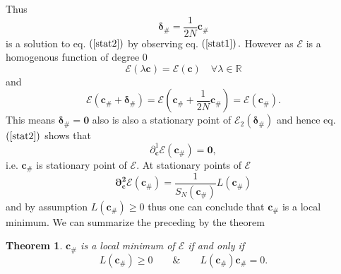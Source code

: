 \documentclass[aps,preprint]{revtex4}%
\newtheorem{theorem}{Theorem}
\begin{document}
Thus
\begin{equation}
\mathbf{\delta}_{\#}=\frac{1}{2N}\mathbf{c}_{\#}%
\end{equation}
is a solution to eq. $\left(  \ref{stat2}\right)  $ by observing eq. $\left(
\ref{stat1}\right)  .$ However as $\mathcal{E}$ is a homogenous function of
degree $0$
\begin{equation}
\mathcal{E}\left(  \lambda\mathbf{c}\right)  =\mathcal{E}\left(
\mathbf{c}\right)  \quad\forall\lambda\in\mathbb{R}%
\end{equation}
and
\begin{equation}
\mathcal{E}\left(  \mathbf{c}_{\#}+\mathbf{\delta}_{\#}\right)  =\mathcal{E}%
\left(  \mathbf{c}_{\#}+\frac{1}{2N}\mathbf{c}_{\#}\right)  =\mathcal{E}%
\left(  \mathbf{c}_{\#}\right)  .
\end{equation}
This means $\mathbf{\delta}_{\#}=\mathbf{0}$ also is also a stationary point
of $\mathcal{E}_{2}\left(  \mathbf{\delta}_{\#}\right)  $ and hence eq.
$\left(  \ref{stat2}\right)  $ shows that
\begin{equation}
\partial_{\mathbf{c}}^{1}\mathcal{E}\left(  \mathbf{c}_{\#}\right)
=\mathbf{0,}%
\end{equation}
i.e. $\mathbf{c}_{\#}$ is stationary point of $\mathcal{E}.$ At stationary
points of $\mathcal{E}$
\begin{equation}
\mathbf{\partial_{\mathbf{c}}^{2}\mathcal{E}\left(  \mathbf{c}_{\#}\right)
=}\frac{1}{S_{N}\left(  \mathbf{c}_{\#}\right)  }L\left(  \mathbf{c}%
_{\#}\right)
\end{equation}
and by assumption $L\left(  \mathbf{c}_{\#}\right)  \geq0$ thus one can
conclude that $\mathbf{c}_{\#}$ is a local minimum. We can summarize the
preceding by the theorem

\begin{theorem}
$\mathbf{c}_{\#}$ is a local minimum of $\mathcal{E}$ if and only if
\begin{equation}
L\left(  \mathbf{c}_{\#}\right)  \geq0\qquad\&\qquad L\left(  \mathbf{c}%
_{\#}\right)  \mathbf{c}_{\#}=0.
\end{equation}

\end{theorem}
\end{document}
